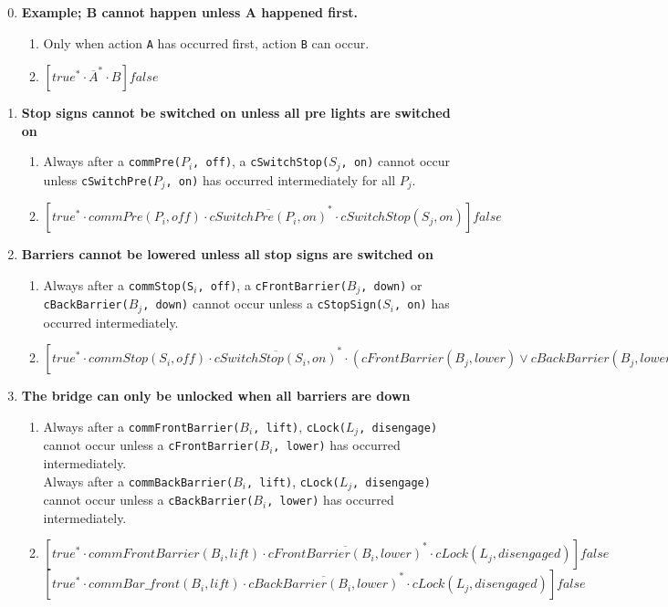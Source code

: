 \begin{enumerate}
  \setcounter{enumi}{-1}


  \item \textbf{Example; B cannot happen unless A happened first.}
  \begin{enumerate}
		\item Only when action \texttt{A} has occurred first, action \texttt{B} can occur.
		\item $[true^* \cdot \overline{A}^{*} \cdot B]false$
	\end{enumerate}

	\item \textbf{Stop signs cannot be switched on unless all pre lights are switched on}
	\begin{enumerate}
		\item Always after a \texttt{commPre($P_i$, off)}, a \texttt{cSwitchStop($S_j$, on)} cannot occur unless \texttt{cSwitchPre($P_j$, on)} has occurred intermediately for all $P_j$.
		\item $[true^* \cdot commPre(P_i, off) \cdot \overline{cSwitchPre(P_i, on)}^{*} \cdot cSwitchStop(S_j, on)]false$
	\end{enumerate}

	\item \textbf{Barriers cannot be lowered unless all stop signs are switched on}
	\begin{enumerate}
		\item Always after a \texttt{commStop(S$_i$, off)}, a \texttt{cFrontBarrier($B_j$, down)} or \texttt{cBackBarrier($B_j$, down)} cannot occur unless a \texttt{cStopSign($S_i$, on)} has occurred intermediately.
		\item $[true^* \cdot commStop(S_i, off) \cdot \overline{cSwitchStop(S_i, on)}^{*} \cdot (cFrontBarrier(B_j, lower) \vee cBackBarrier(B_j, lower))]false$ \\
	\end{enumerate}

	\item \textbf{The bridge can only be unlocked when all barriers are down}
	\begin{enumerate}
		\item Always after a \texttt{commFrontBarrier($B_i$, lift)}, \texttt{cLock($L_j$, disengage)} cannot occur unless a \texttt{cFrontBarrier($B_i$, lower)} has occurred intermediately. \\
					Always after a \texttt{commBackBarrier($B_i$, lift)}, \texttt{cLock($L_j$, disengage)} cannot occur unless a \texttt{cBackBarrier($B_i$, lower)} has occurred intermediately.
		\item $[true^* \cdot commFrontBarrier(B_i, lift) \cdot \overline{cFrontBarrier(B_i, lower)}^{*} \cdot cLock(L_j, disengaged)]false$
					$[true^* \cdot commBar\_front(B_i, lift) \cdot \overline{cBackBarrier(B_i, lower)}^{*} \cdot cLock(L_j, disengaged)]false$
	\end{enumerate}


\end{enumerate}
